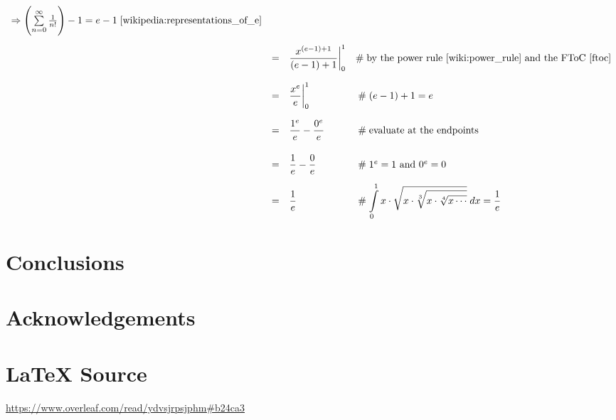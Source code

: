 \documentclass{article}
\theoremstyle{definition}
\begin{document}
\begin{center}
\begin{math}
\begin{array}{llll}
											\Rightarrow \left (\sum\limits _{n=0}^{\infty} \frac{1}{n!} \right ) - 1 
											= e - 1 \; \cite{wikipedia:representations_of_e} \\
[18pt]
		&=& \dfrac{x^{(e-1)+1}}{(e-1)+1} \bigg |_{0}^{1} 
			&\hspace{0em} \mathrel{\#} \text{by the power rule \cite{wiki:power_rule}
												and the FToC \cite{ftoc}} \\
[18pt]
		&=& \dfrac{x^{e}}{e} \bigg |_{0}^{1}
			&\hspace{0.25em} \mathrel{\#} (e - 1) + 1 = e \\
[18pt]
		&=& \dfrac{1^{e}}{e} - \dfrac{0^{e}}{e}
			&\hspace{0.25em} \mathrel{\#} \text{evaluate at the endpoints} \\
[18pt]
		&=& \dfrac{1}{e} - \dfrac{0}{e}
			&\hspace{0.25em} \mathrel{\#} 1^e = 1 \text{ and } 0^e = 0 \\
[12pt]
		&=& \dfrac{1}{e}
			&\hspace{0.25em} \mathrel{\#} {\displaystyle \int\limits_{0}^{1} x \cdot 
	   		\sqrt{x \cdot \sqrt[3]{x \cdot \sqrt[4]{x \cdots}}}}
			\; dx = \dfrac{1}{e} 

	   \end{array}
	  \end{math}
\end{center}


\section{Conclusions}
\label{sec:conclusions}
%
%
%
\section*{Acknowledgements}
\label{sec:acknowledgements}
%
%
\section*{\LaTeX \hspace{0.025 mm} Source}
\url{https://www.overleaf.com/read/ydvsjrpsjphm#b24ca3}
%
%
%


%
%
%
%
%
\end{document}
